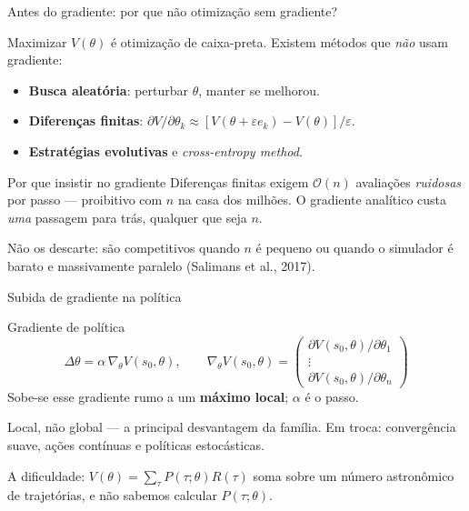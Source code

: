 \documentclass[aspectratio=169, 11pt]{beamer}
\newcommand{\thv}{\theta}                       %
\newcommand{\gth}{\nabla_{\thv}}                %
\newcommand{\traj}{\tau}                        %
\newcommand{\Rtraj}{R(\traj)}
\newcommand{\Ptraj}{P(\traj;\thv)}
\begin{document}
\begin{frame}{Antes do gradiente: por que não otimização sem gradiente?}

  Maximizar $V(\thv)$ é otimização de caixa-preta. Existem métodos que
  \emph{não} usam gradiente:

  \begin{itemize}\setlength{\itemsep}{0.2ex}
    \item \textbf{Busca aleatória}: perturbar $\thv$, manter se melhorou.
    \item \textbf{Diferenças finitas}:
      $\partial V/\partial \thv_k \approx [V(\thv + \varepsilon e_k) - V(\thv)]/\varepsilon$.
    \item \textbf{Estratégias evolutivas} e \emph{cross-entropy method}.
  \end{itemize}

  \begin{teobox}{Por que insistir no gradiente}
    Diferenças finitas exigem $\mathcal{O}(n)$ avaliações \emph{ruidosas} por
    passo --- proibitivo com $n$ na casa dos milhões. O gradiente analítico
    custa \emph{uma} passagem para trás, qualquer que seja $n$.
  \end{teobox}

  \begin{ideiabox}
    Não os descarte: são competitivos quando $n$ é pequeno ou quando o
    simulador é barato e massivamente paralelo (Salimans et al., 2017).
  \end{ideiabox}
\end{frame}

\begin{frame}{Subida de gradiente na política}

  \begin{defbox}{Gradiente de política}
    \[
      \Delta \thv = \alpha\, \gth V(s_0,\thv),
      \qquad
      \gth V(s_0,\thv) =
      \begin{pmatrix}
        \partial V(s_0,\thv) / \partial \thv_1 \\[-0.2em]
        \vdots \\[-0.2em]
        \partial V(s_0,\thv) / \partial \thv_n
      \end{pmatrix}
    \]
    Sobe-se esse gradiente rumo a um \textbf{máximo local}; $\alpha$ é o passo.
  \end{defbox}

  \begin{alertabox}
    Local, não global --- a principal desvantagem da família. Em troca:
    convergência suave, ações contínuas e políticas estocásticas.
  \end{alertabox}

  A dificuldade: $V(\thv) = \sum_{\traj}\Ptraj \Rtraj$ soma sobre um número
  astronômico de trajetórias, e não sabemos calcular $\Ptraj$.
\end{frame}
\end{document}
